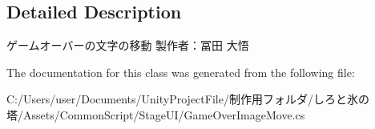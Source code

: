 \subsection{Detailed Description}
ゲームオーバーの文字の移動 製作者：冨田 大悟 



The documentation for this class was generated from the following file\+:\begin{DoxyCompactItemize}
\item 
C\+:/\+Users/user/\+Documents/\+Unity\+Project\+File/制作用フォルダ/しろと氷の塔/\+Assets/\+Common\+Script/\+Stage\+U\+I/Game\+Over\+Image\+Move.\+cs\end{DoxyCompactItemize}
